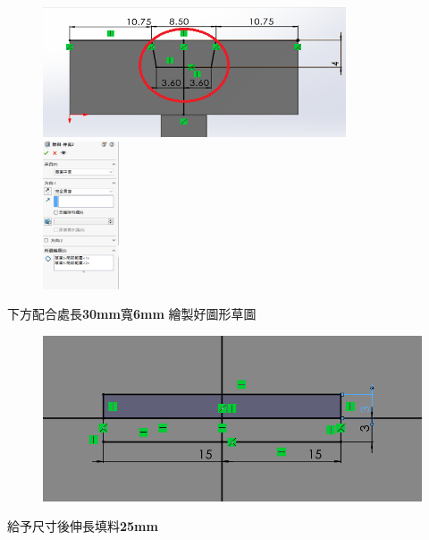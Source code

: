 \begin{figure}[h!]
    \centering
    \includegraphics[width=0.8\textwidth]{./../images/6-1-13.png}
    \includegraphics[width=0.2\textwidth]{./../images/6-1-14.png}
\end{figure}

\noindent 下方配合處長\textbf{30mm}寬\textbf{6mm} 繪製好圖形草圖

\begin{figure}[h!]
    \centering
    \includegraphics[width=1\textwidth]{./../images/6-1-15.png}
\end{figure}

\noindent 給予尺寸後伸長填料\textbf{25mm}

